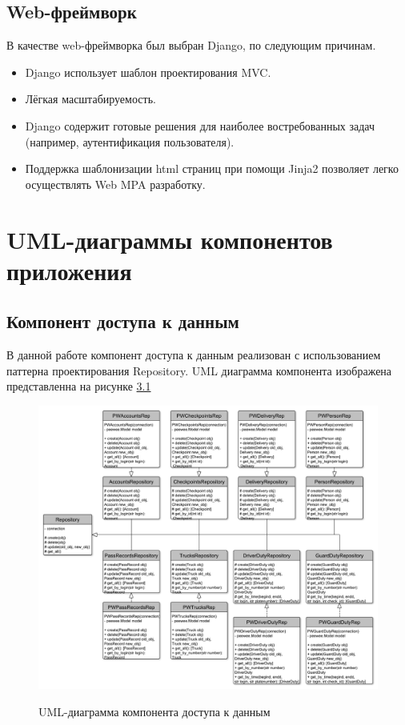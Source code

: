 \subsection{Web-фреймворк}
В качестве web-фреймворка был выбран Django, по следующим причинам.
\begin{itemize}
	\item Django использует шаблон проектирования MVC.
	\item Лёгкая масштабируемость.
	\item Django содержит готовые решения для наиболее востребованных задач (например, аутентификация пользователя).
	\item Поддержка шаблонизации html страниц при помощи Jinja2 позволяет легко осуществлять Web MPA разработку.
\end{itemize}


\section{UML-диаграммы компонентов приложения}
\newpage
\subsection{Компонент доступа к данным}
В данной работе компонент доступа к данным реализован с использованием паттерна проектирования Repository. UML диаграмма компонента изображена представленна на рисунке \hyperref[rep_pic]{3.1}  

\begin{figure}[h!] \label{rep_pic}
	\begin{center}
		{\includegraphics[scale=0.4, angle=0]{uml/repsoitory.pdf}}
		\caption{UML-диаграмма компонента доступа к данным}
	\end{center}
\end{figure}

